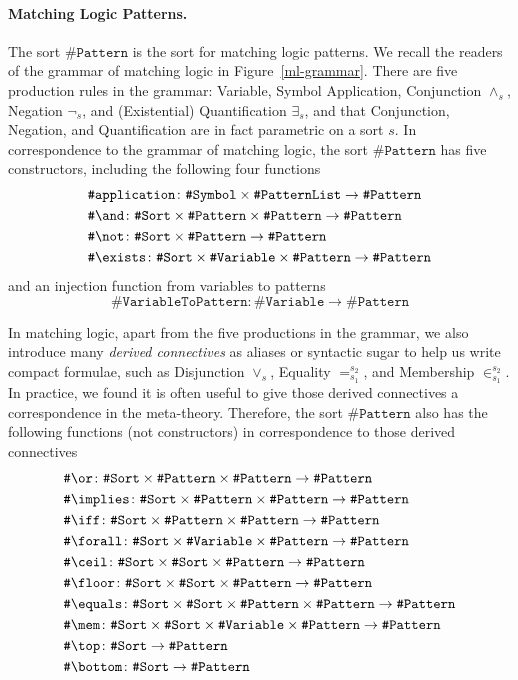 \documentclass[UTF8,11pt]{article}
\theoremstyle{plain}
\theoremstyle{definition}
\theoremstyle{remark}
\newcommand{\sharpsymbol}{\#}
\newcommand{\KSort}{\texttt{\sharpsymbol Sort}}
\newcommand{\KSymbol}{\texttt{\sharpsymbol Symbol}}
\newcommand{\KPatternList}{\texttt{\sharpsymbol PatternList}}
\newcommand{\KVariable}{\texttt{\sharpsymbol Variable}}
\newcommand{\KVariableToKPattern}{\texttt{\sharpsymbol VariableToPattern}}
\newcommand{\KPattern}{\texttt{\sharpsymbol Pattern}}
\newcommand{\Kand}{\texttt{\sharpsymbol  \slashsymbol and}}
\newcommand{\Kor}{\texttt{\sharpsymbol \slashsymbol  or}}
\newcommand{\Kimplies}{\texttt{\sharpsymbol  \slashsymbol implies}}
\newcommand{\Kiff}{\texttt{\sharpsymbol  \slashsymbol iff}}
\newcommand{\Knot}{\texttt{\sharpsymbol  \slashsymbol not}}
\newcommand{\Kapplication}{\texttt{\sharpsymbol application}}
\newcommand{\Kexists}{\texttt{\sharpsymbol \slashsymbol  exists}}
\newcommand{\Kforall}{\texttt{\sharpsymbol \slashsymbol  forall}}
\newcommand{\Kequals}{\texttt{\sharpsymbol \slashsymbol  equals}}
\newcommand{\Kmembership}{\texttt{\sharpsymbol \slashsymbol  mem}}
\newcommand{\Ktop}{\texttt{\sharpsymbol \slashsymbol  top}}
\newcommand{\Kbottom}{\texttt{\sharpsymbol \slashsymbol  bottom}}
\newcommand{\Kfloor}{\texttt{\sharpsymbol \slashsymbol  floor}}
\newcommand{\Kceil}{\texttt{\sharpsymbol \slashsymbol  ceil}}
\newcommand{\slashsymbol}{\symbol{92}}
\begin{document}
\paragraph{Matching Logic Patterns.}
The sort $\KPattern$ is the sort for matching logic patterns.
We recall the readers of the grammar of matching logic in 
Figure~\ref{ml-grammar}.
There are five production rules in the grammar: Variable, Symbol Application, 
Conjunction $\wedge_s$, Negation $\neg_s$, and (Existential) Quantification 
$\exists_s$, and that Conjunction, Negation, and Quantification are in fact 
parametric on a sort $s$.
In correspondence to the grammar of matching logic, the sort $\KPattern$ 
has five constructors, including the following four 
functions
\begin{align*}
  & \Kapplication \colon \KSymbol \times \KPatternList \to \KPattern
  \\
  & \Kand \colon \KSort \times \KPattern \times \KPattern \to \KPattern
  \\
  & \Knot \colon \KSort \times \KPattern \to \KPattern
  \\
  & \Kexists \colon \KSort \times \KVariable \times \KPattern \to \KPattern
\end{align*}
and an injection function from variables to patterns
\begin{equation*}
  \KVariableToKPattern \colon \KVariable \to \KPattern
\end{equation*}

In matching logic, apart from the five productions in the grammar, we also 
introduce many \emph{derived connectives} as aliases or syntactic sugar to help 
us write compact formulae, such as Disjunction $\vee_s$, Equality 
$=_{s_1}^{s_2}$, and Membership $\in_{s_1}^{s_2}$.
In practice, we found it is often useful to give those derived connectives a 
correspondence in the meta-theory. Therefore, the sort $\KPattern$ also has
the following functions (not constructors) in correspondence to those derived 
connectives
\begin{align*}
  & \Kor \colon \KSort\times\KPattern \times \KPattern   \to \KPattern
  \\
  & \Kimplies \colon \KSort\times\KPattern \times \KPattern   \to \KPattern
  \\
  & \Kiff \colon \KSort\times\KPattern \times \KPattern   \to \KPattern
  \\
  & \Kforall \colon \KSort\times\KVariable \times \KPattern   \to \KPattern
  \\
  & \Kceil \colon \KSort\times\KSort\times\KPattern     \to \KPattern
  \\
  & \Kfloor \colon \KSort\times\KSort\times\KPattern     \to \KPattern
  \\
  & \Kequals \colon \KSort\times\KSort \times \KPattern \times \KPattern \to 
  \KPattern
  \\
  & \Kmembership \colon \KSort \times \KSort \times \KVariable \times 
  \KPattern  \to \KPattern
  \\
  & \Ktop \colon \KSort \to \KPattern
  \\
  & \Kbottom \colon \KSort \to \KPattern
\end{align*}
\end{document}
